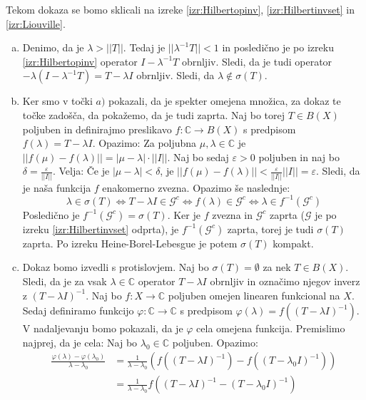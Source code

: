\documentclass[mat2]{matdelo}
\newcommand{\C}{\mathbb{C}}
\newcommand{\abs}[1]{\ensuremath{\lvert #1 \rvert}}
\newcommand{\norm}[1]{\abs{\abs{#1}}}
\newcommand{\map}[3]{\ensuremath{{#1}:{#2}\rightarrow{#3}}}
\begin{document}
		\begin{dokaz}
			Tekom dokaza se bomo sklicali na izreke \ref{izr:Hilbertopinv}, \ref{izr:Hilbertinvset} in \ref{izr:Liouville}.
			\begin{enumerate}[a)]
				\item Denimo, da je $\lambda > \norm{T}$. Tedaj je $\norm{\lambda^{-1}T} < 1$ in posledično je po izreku \ref{izr:Hilbertopinv} operator $I - \lambda^{-1}T$ obrnljiv. Sledi, da je tudi operator $-\lambda(I - \lambda^{-1}T)= T - \lambda I$ obrnljiv. Sledi, da $\lambda\notin\sigma(T)$.
				\item Ker smo v točki $a)$ pokazali, da je spekter omejena množica, za dokaz te točke zadošča, da pokažemo, da je tudi zaprta. Naj bo torej $T\in B(X)$ poljuben in definirajmo preslikavo $\map{f}{\C}{B(X)}$ s predpisom $f(\lambda) = T - \lambda I$. Opazimo: Za poljubna $\mu, \lambda \in \C$ je $\norm{f(\mu) - f(\lambda)} = \abs{\mu - \lambda}\cdot\norm{I}$.
				Naj bo sedaj $\varepsilon>0$ poljuben in naj bo $\delta = \frac{\varepsilon}{\norm{I}}$. Velja: Če je $\abs{\mu - \lambda}<\delta$, je $\norm{f(\mu) - f(\lambda)} < \frac{\varepsilon}{\norm{I}}\norm{I} = \varepsilon$. Sledi, da je naša funkcija $f$ enakomerno zvezna. Opazimo še naslednje: $$\lambda\in\sigma(T) \iff T-\lambda I \in \mathcal{G}^{c}\iff f(\lambda)\in\mathcal{G}^{c} \iff \lambda\in f^{-1}(\mathcal{G}^{c})$$
				Posledično je $f^{-1}(\mathcal{G}^{c}) = \sigma(T)$. Ker je $f$ zvezna in $\mathcal{G}^{c}$ zaprta ($\mathcal{G}$ je po izreku \ref{izr:Hilbertinvset} odprta), je $f^{-1}(\mathcal{G}^{c})$ zaprta, torej je tudi $\sigma(T)$ zaprta. Po izreku Heine-Borel-Lebesgue je potem $\sigma(T)$ kompakt.
				\item Dokaz bomo izvedli s protislovjem. Naj bo $\sigma(T)=\emptyset$ za nek $T\in B(X)$. Sledi, da je za vsak $\lambda\in\C$ operator $T - \lambda I$ obrnljiv in označimo njegov inverz z $(T - \lambda I)^{-1}$. Naj bo $\map{f}{X}{\C}$ poljuben omejen linearen funkcional na $X$. Sedaj  definiramo funkcijo $\map{\varphi}{\C}{\C}$ s predpisom $\varphi(\lambda)= f((T-\lambda I)^{-1})$. V nadaljevanju bomo pokazali, da je $\varphi$ cela omejena funkcija.
				Premislimo najprej, da je cela: Naj bo $\lambda_0\in\C$ poljuben. Opazimo: \begin{align*}
					\frac{\varphi(\lambda)-\varphi(\lambda_0)}{\lambda - \lambda_0} &= \frac{1}{\lambda - \lambda_0}(f((T-\lambda I)^{-1}) - f((T-\lambda_0 I)^{-1})) \\
					&= \frac{1}{\lambda - \lambda_0}f((T-\lambda I)^{-1} - (T-\lambda_0 I)^{-1}) \\

\end{align*}
\end{enumerate}
\end{dokaz}
\end{document}
